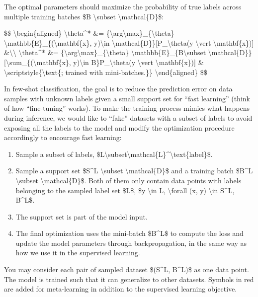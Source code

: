 The optimal parameters should maximize the probability of true labels across multiple training batches \$B \textbackslash subset \textbackslash mathcal\{D\}\$:

\$\$ \textbackslash begin\{aligned\} \textbackslash theta\^{}* \&= \{\textbackslash arg\textbackslash max\}\_\{\textbackslash theta\} \textbackslash mathbb\{E\}\_\{(\textbackslash mathbf\{x\}, y)\textbackslash in \textbackslash mathcal\{D\}\}{[}P\_\textbackslash theta(y \textbackslash vert \textbackslash mathbf\{x\}){]} \&\textbackslash\textbackslash{} \textbackslash theta\^{}* \&= \{\textbackslash arg\textbackslash max\}\_\{\textbackslash theta\} \textbackslash mathbb\{E\}\_\{B\textbackslash subset \textbackslash mathcal\{D\}\}{[}\textbackslash sum\_\{(\textbackslash mathbf\{x\}, y)\textbackslash in B\}P\_\textbackslash theta(y \textbackslash vert \textbackslash mathbf\{x\}){]} \& \textbackslash scriptstyle\{\textbackslash text\{; trained with mini-batches.\}\} \textbackslash end\{aligned\} \$\$

In few-shot classification, the goal is to reduce the prediction error on data samples with unknown labels given a small support set for ``fast learning'' (think of how ``fine-tuning'' works). To make the training process mimics what happens during inference, we would like to ``fake'' datasets with a subset of labels to avoid exposing all the labels to the model and modify the optimization procedure accordingly to encourage fast learning:

\begin{enumerate}
\tightlist
\item
  Sample a subset of labels, \$L\textbackslash subset\textbackslash mathcal\{L\}\^{}\textbackslash text\{label\}\$.
\item
  Sample a support set \$S\^{}L \textbackslash subset \textbackslash mathcal\{D\}\$ and a training batch \$B\^{}L \textbackslash subset \textbackslash mathcal\{D\}\$. Both of them only contain data points with labels belonging to the sampled label set \$L\$, \$y \textbackslash in L, \textbackslash forall (x, y) \textbackslash in S\^{}L, B\^{}L\$.
\item
  The support set is part of the model input.
\item
  The final optimization uses the mini-batch \$B\^{}L\$ to compute the loss and update the model parameters through backpropagation, in the same way as how we use it in the supervised learning.
\end{enumerate}

You may consider each pair of sampled dataset \$(S\^{}L, B\^{}L)\$ as one data point. The model is trained such that it can generalize to other datasets. Symbols in red are added for meta-learning in addition to the supervised learning objective.

